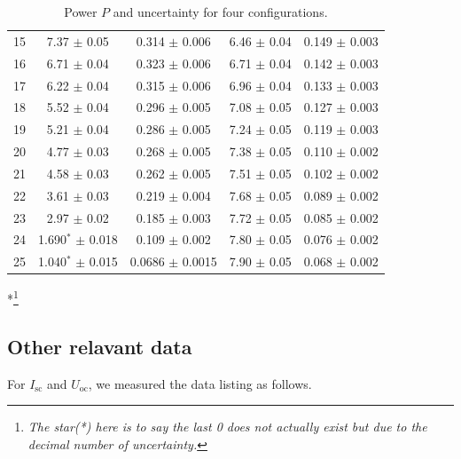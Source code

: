 \documentclass[a4paper]{article}
\begin{document}
\begin{table}[H]
\begin{tabular}{c||cc|cc}
		15 & 7.37  $\pm$ 0.05             & 0.314  $\pm$ 0.006         & 6.46   $\pm$ 0.04            & 0.149   $\pm$ 0.003  \\
		16 & 6.71  $\pm$ 0.04             & 0.323  $\pm$ 0.006         & 6.71   $\pm$ 0.04            & 0.142   $\pm$ 0.003  \\
		17 & 6.22  $\pm$ 0.04             & 0.315  $\pm$ 0.006         & 6.96   $\pm$ 0.04            & 0.133   $\pm$ 0.003  \\
		18 & 5.52  $\pm$ 0.04             & 0.296  $\pm$ 0.005         & 7.08   $\pm$ 0.05            & 0.127   $\pm$ 0.003  \\
		19 & 5.21  $\pm$ 0.04             & 0.286  $\pm$ 0.005         & 7.24   $\pm$ 0.05            & 0.119   $\pm$ 0.003  \\
		20 & 4.77  $\pm$ 0.03             & 0.268  $\pm$ 0.005         & 7.38   $\pm$ 0.05            & 0.110   $\pm$ 0.002  \\
		21 & 4.58  $\pm$ 0.03             & 0.262  $\pm$ 0.005         & 7.51   $\pm$ 0.05            & 0.102   $\pm$ 0.002  \\
		22 & 3.61  $\pm$ 0.03             & 0.219  $\pm$ 0.004         & 7.68   $\pm$ 0.05            & 0.089   $\pm$ 0.002  \\
		23 & 2.97  $\pm$ 0.02             & 0.185  $\pm$ 0.003         & 7.72   $\pm$ 0.05            & 0.085   $\pm$ 0.002  \\
		24 & 1.690$^*$  $\pm$ 0.018       & 0.109  $\pm$ 0.002         & 7.80   $\pm$ 0.05            & 0.076   $\pm$ 0.002  \\
		25 & 1.040$^*$  $\pm$ 0.015       & 0.0686 $\pm$ 0.0015        & 7.90   $\pm$ 0.05            & 0.068   $\pm$ 0.002  \\
		\hline
	\end{tabular}
	\caption{Power $P$ and uncertainty for four configurations.}
	\label{table::P-U_2}
\end{table}
*\footnote{\textit{The star(*) here is to say the last 0 does not actually exist but due to the decimal number of uncertainty.}}

\subsection{Other relavant data}

For $I_\text{sc}$ and $U_\text{oc}$, we measured the data listing as follows.
\end{document}
